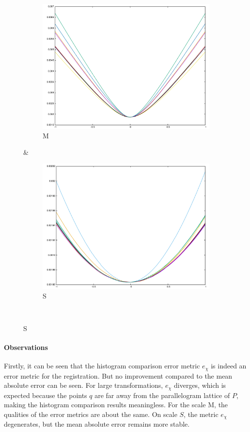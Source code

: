 {\begin{figure}[H]
\begin{subfigure}{.33\textwidth}
	\includegraphics[width=\linewidth]{fig/ajherr/t/M_mae.pdf}
	\caption{M}
\end{subfigure}&
\begin{subfigure}{.33\textwidth}
	\includegraphics[width=\linewidth]{fig/ajherr/t/S_mae.pdf}
	\caption{S}
\end{subfigure}\\
\end{figure}

\paragraph{Observations} Firstly, it can be seen that the histogram comparison error metric $e_{\chi}$ is indeed an error metric for the registration. But no improvement compared to the mean absolute error can be seen. For large transformations, $e_{\chi}$ diverges, which is expected because the points $q$ are far away from the parallelogram lattice of $P$, making the histogram comparison results meaningless. For the scale M, the qualities of the error metrics are about the same. On scale $S$, the metric $e_{\chi}$ degenerates, but the mean absolute error remains more stable.


}
